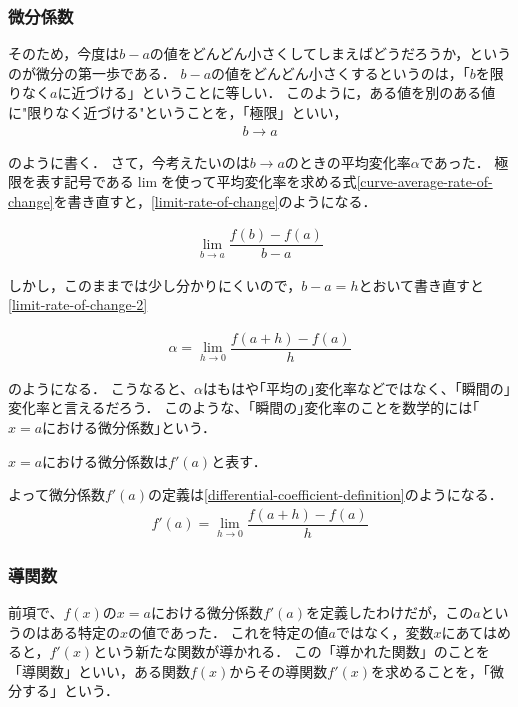 \subsubsection{微分係数}
そのため，今度は$b-a$の値をどんどん小さくしてしまえばどうだろうか，というのが微分の第一歩である．
$b-a$の値をどんどん小さくするというのは，「$b$を限りなく$a$に近づける」ということに等しい．
このように，ある値を別のある値に"限りなく近づける"ということを，「極限」といい，
\begin{align}
b \to a
\end{align}

のように書く．
さて，今考えたいのは$b \to a$のときの平均変化率$\alpha$であった．
極限を表す記号である$\lim{}$を使って平均変化率を求める式\ref{curve-average-rate-of-change}を書き直すと，\ref{limit-rate-of-change}のようになる．

\begin{align}
\lim_{b \to a} \dfrac{f(b)-f(a)}{b-a}
\label{limit-rate-of-change}
\end{align}

しかし，このままでは少し分かりにくいので，$b-a = h$とおいて書き直すと\ref{limit-rate-of-change-2}

\begin{align}
\alpha = \lim_{h \to 0} \dfrac{f(a+h)-f(a)}{h}
\label{limit-rate-of-change-2}
\end{align}

のようになる．
こうなると、$\alpha$はもはや｢平均の｣変化率などではなく、｢瞬間の｣変化率と言えるだろう．
このような、｢瞬間の｣変化率のことを数学的には｢$x=a$における微分係数｣という．

$x=a$における微分係数は$f'(a)$と表す．

よって微分係数$f'(a)$の定義は\ref{differential-coefficient-definition}のようになる．
\begin{align}
f'(a) = \lim_{h \to 0} \dfrac{f(a+h)-f(a)}{h}
\label{differential-coefficient-definition}
\end{align}

\newpage
\subsubsection{導関数}
前項で、$f(x)$の$x=a$における微分係数$f'(a)$を定義したわけだが，この$a$というのはある特定の$x$の値であった．
これを特定の値$a$ではなく，変数$x$にあてはめると，$f'(x)$という新たな関数が導かれる．
この「導かれた関数」のことを「導関数」といい，ある関数$f(x)$からその導関数$f'(x)
$を求めることを，「微分する」という．

